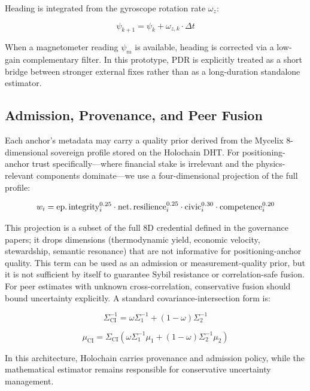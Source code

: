 \documentclass[12pt,a4paper]{article}
\begin{document}
Heading is integrated from the gyroscope rotation rate $\omega_z$:

\begin{equation}
\psi_{k+1} = \psi_k + \omega_{z,k} \cdot \Delta t
\end{equation}

When a magnetometer reading $\psi_m$ is available, heading is corrected via a low-gain complementary filter. In this prototype, PDR is explicitly treated as a short bridge between stronger external fixes rather than as a long-duration standalone estimator.

\subsection{Admission, Provenance, and Peer Fusion}

Each anchor's metadata may carry a quality prior derived from the Mycelix 8-dimensional sovereign profile stored on the Holochain DHT. For positioning-anchor trust specifically---where financial stake is irrelevant and the physics-relevant components dominate---we use a four-dimensional projection of the full profile:

\begin{equation}
w_i = \text{ep.\,integrity}_i^{0.25} \cdot \text{net.\,resilience}_i^{0.25} \cdot \text{civic}_i^{0.30} \cdot \text{competence}_i^{0.20}
\end{equation}

This projection is a subset of the full 8D credential defined in the governance papers; it drops dimensions (thermodynamic yield, economic velocity, stewardship, semantic resonance) that are not informative for positioning-anchor quality. This term can be used as an admission or measurement-quality prior, but it is not sufficient by itself to guarantee Sybil resistance or correlation-safe fusion. For peer estimates with unknown cross-correlation, conservative fusion should bound uncertainty explicitly. A standard covariance-intersection form is:

\begin{equation}
\Sigma_{\text{CI}}^{-1} = \omega \Sigma_1^{-1} + (1-\omega)\Sigma_2^{-1}
\end{equation}

\begin{equation}
\mu_{\text{CI}} = \Sigma_{\text{CI}} \left( \omega \Sigma_1^{-1}\mu_1 + (1-\omega)\Sigma_2^{-1}\mu_2 \right)
\end{equation}

In this architecture, Holochain carries provenance and admission policy, while the mathematical estimator remains responsible for conservative uncertainty management.
\end{document}
